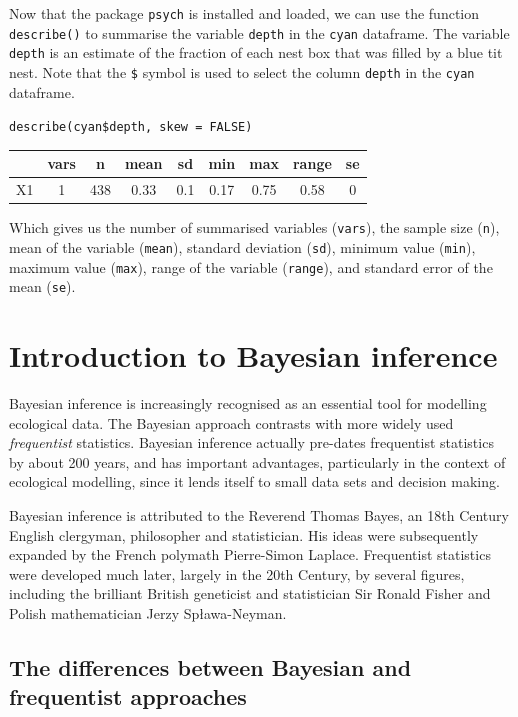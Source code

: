 \documentclass[
]{book}
\begin{document}
Now that the package \texttt{psych} is installed and loaded, we can use the function \texttt{describe()} to summarise the variable \texttt{depth} in the \texttt{cyan} dataframe. The variable \texttt{depth} is an estimate of the fraction of each nest box that was filled by a blue tit nest. Note that the \texttt{\$} symbol is used to select the column \texttt{depth} in the \texttt{cyan} dataframe.

\texttt{describe(cyan\$depth,\ skew\ =\ FALSE)}

\begin{longtable}[]{@{}ccccccccc@{}}
\toprule
& vars & n & mean & sd & min & max & range & se \\
\midrule
\endhead
X1 & 1 & 438 & 0.33 & 0.1 & 0.17 & 0.75 & 0.58 & 0 \\
\bottomrule
\end{longtable}

Which gives us the number of summarised variables (\texttt{vars}), the sample size (\texttt{n}), mean of the variable (\texttt{mean}), standard deviation (\texttt{sd}), minimum value (\texttt{min}), maximum value (\texttt{max}), range of the variable (\texttt{range}), and standard error of the mean (\texttt{se}).

\hypertarget{introbayesian}{%
\chapter{Introduction to Bayesian inference}\label{introbayesian}}

Bayesian inference is increasingly recognised as an essential tool for modelling ecological data. The Bayesian approach contrasts with more widely used \emph{frequentist} statistics. Bayesian inference actually pre-dates frequentist statistics by about 200 years, and has important advantages, particularly in the context of ecological modelling, since it lends itself to small data sets and decision making.

Bayesian inference is attributed to the Reverend Thomas Bayes, an 18th Century English clergyman, philosopher and statistician. His ideas were subsequently expanded by the French polymath Pierre-Simon Laplace. Frequentist statistics were developed much later, largely in the 20th Century, by several figures, including the brilliant British geneticist and statistician Sir Ronald Fisher and Polish mathematician Jerzy Spława-Neyman.

\hypertarget{freqbayes}{%
\section{The differences between Bayesian and frequentist approaches}\label{freqbayes}}
\end{document}
